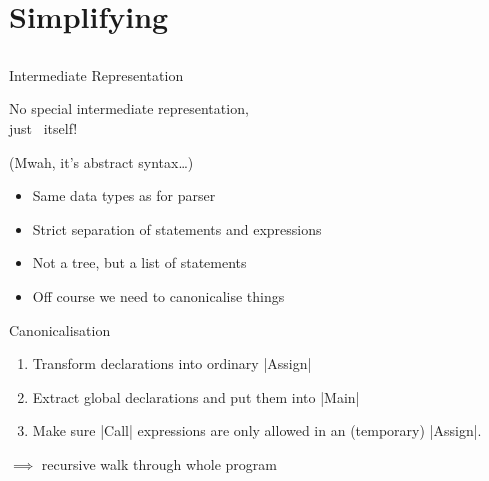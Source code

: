 \section{Simplifying}
\subsection*{}

\begin{frame}[fragile]{Intermediate Representation}

  No special intermediate representation,\\
  just \SPL\ itself!

  \pause
  \medskip

  (Mwah, it's abstract syntax\ldots)

  \begin{itemize}
      \item Same data types as for parser
      \item Strict separation of statements and expressions
      \item Not a tree, but a list of statements
      \item Off course we need to canonicalise things
  \end{itemize}

\end{frame}

\begin{frame}[fragile]{Canonicalisation}

  \begin{enumerate}
    \item Transform declarations into ordinary |Assign|
    \item Extract global declarations and put them into |Main|
    \item Make sure |Call| expressions are only allowed in an (temporary) |Assign|.
  \end{enumerate}

  \pause

  $\implies$ recursive walk through whole program

\end{frame}

